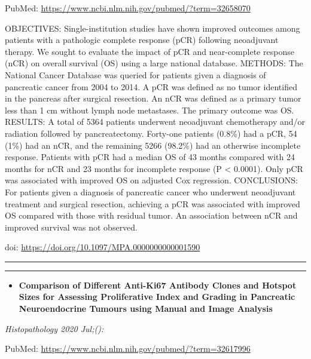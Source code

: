 \documentclass[
]{article}
\providecommand{\tightlist}{%
  \setlength{\itemsep}{0pt}\setlength{\parskip}{0pt}}
\begin{document}
PubMed: \url{https://www.ncbi.nlm.nih.gov/pubmed/?term=32658070}

OBJECTIVES: Single-institution studies have shown improved outcomes
among patients with a pathologic complete response (pCR) following
neoadjuvant therapy. We sought to evaluate the impact of pCR and
near-complete response (nCR) on overall survival (OS) using a large
national database. METHODS: The National Cancer Database was queried for
patients given a diagnosis of pancreatic cancer from 2004 to 2014. A pCR
was defined as no tumor identified in the pancreas after surgical
resection. An nCR was defined as a primary tumor less than 1 cm without
lymph node metastases. The primary outcome was OS. RESULTS: A total of
5364 patients underwent neoadjuvant chemotherapy and/or radiation
followed by pancreatectomy. Forty-one patients (0.8\%) had a pCR, 54
(1\%) had an nCR, and the remaining 5266 (98.2\%) had an otherwise
incomplete response. Patients with pCR had a median OS of 43 months
compared with 24 months for nCR and 23 months for incomplete response (P
\textless{} 0.0001). Only pCR was associated with improved OS on
adjusted Cox regression. CONCLUSIONS: For patients given a diagnosis of
pancreatic cancer who underwent neoadjuvant treatment and surgical
resection, achieving a pCR was associated with improved OS compared with
those with residual tumor. An association between nCR and improved
survival was not observed.

doi: \url{https://doi.org/10.1097/MPA.0000000000001590}

\begin{center}\rule{0.5\linewidth}{0.5pt}\end{center}

\begin{center}\rule{0.5\linewidth}{0.5pt}\end{center}

\begin{itemize}
\tightlist
\item
  \textbf{Comparison of Different Anti-Ki67 Antibody Clones and Hotspot
  Sizes for Assessing Proliferative Index and Grading in Pancreatic
  Neuroendocrine Tumours using Manual and Image Analysis}
\end{itemize}

\emph{Histopathology 2020 Jul;():}

PubMed: \url{https://www.ncbi.nlm.nih.gov/pubmed/?term=32617996}
\end{document}
